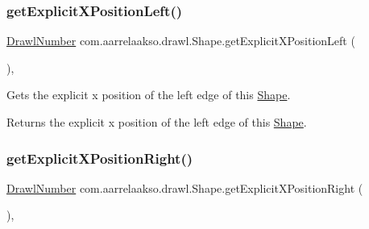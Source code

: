 \subsubsection{\texorpdfstring{get\+Explicit\+X\+Position\+Left()}{getExplicitXPositionLeft()}}
{\footnotesize\ttfamily \hyperlink{classcom_1_1aarrelaakso_1_1drawl_1_1_drawl_number}{Drawl\+Number} com.\+aarrelaakso.\+drawl.\+Shape.\+get\+Explicit\+X\+Position\+Left (\begin{DoxyParamCaption}{ }\end{DoxyParamCaption})\hspace{0.3cm}{\ttfamily [protected]}, {\ttfamily [inherited]}}



Gets the explicit x position of the left edge of this \hyperlink{classcom_1_1aarrelaakso_1_1drawl_1_1_shape}{Shape}. 

\begin{DoxyReturn}{Returns}
the explicit x position of the left edge of this \hyperlink{classcom_1_1aarrelaakso_1_1drawl_1_1_shape}{Shape}. 
\end{DoxyReturn}
\mbox{\label{classcom_1_1aarrelaakso_1_1drawl_1_1_shape_a19970b658b55e4e61de31aaaef8cf7fe}} 
\subsubsection{\texorpdfstring{get\+Explicit\+X\+Position\+Right()}{getExplicitXPositionRight()}}
{\footnotesize\ttfamily \hyperlink{classcom_1_1aarrelaakso_1_1drawl_1_1_drawl_number}{Drawl\+Number} com.\+aarrelaakso.\+drawl.\+Shape.\+get\+Explicit\+X\+Position\+Right (\begin{DoxyParamCaption}{ }\end{DoxyParamCaption})\hspace{0.3cm}{\ttfamily [protected]}, {\ttfamily [inherited]}}

\mbox{\label{classcom_1_1aarrelaakso_1_1drawl_1_1_shape_aa26eb0263851ed8f8221bf3740e6e584}} 
